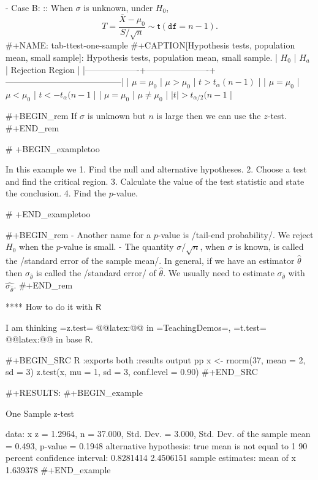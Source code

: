 - Case B: :: When \(\sigma\) is unknown, under \(H_{0}\),
   \[
   T = \frac{\overline{X} - \mu_{0}}{S/\sqrt{n}} \sim \mathsf{t}(\mathtt{df} = n - 1).
   \]
   #+NAME: tab-ttest-one-sample
   #+CAPTION[Hypothesis tests, population mean, small sample]: Hypothesis tests, population mean, small sample.
   | \(H_{0}\)         | \(H_{a}\)            | Rejection Region                        |
   |-------------------+----------------------+-----------------------------------------|
   | \(\mu = \mu_{0}\) | \(\mu > \mu_{0}\)    | \(t > t_{\alpha}(n - 1)\)               |
   | \(\mu = \mu_{0}\) | \(\mu < \mu_{0}\)    | \(t < -t_{\alpha}(n - 1\)               |
   | \(\mu = \mu_{0}\) | \(\mu \neq \mu_{0}\) | \( \vert t \vert > t_{\alpha/2}(n - 1\) |

#+BEGIN_rem
If \(\sigma\) is unknown but \(n\) is large then we can use the
\(z\)-test.
#+END_rem

# +BEGIN_exampletoo

In this example we
1. Find the null and alternative hypotheses.
2. Choose a test and find the critical region.
3. Calculate the value of the test statistic and state the conclusion.
4. Find the \(p\)-value.

# +END_exampletoo


#+BEGIN_rem
- Another name for a \(p\)-value is /tail-end probability/. We reject
  \(H_{0}\) when the \(p\)-value is small.
- The quantity \(\sigma/\sqrt{n}\), when \(\sigma\) is known, is
  called the /standard error of the sample mean/. In general, if we
  have an estimator \(\hat{\theta}\) then \(\sigma_{\hat{\theta}}\) is
  called the /standard error/ of \(\hat{\theta}\). We usually need to
  estimate \(\sigma_{\hat{\theta}}\) with
  \(\hat{\sigma_{\hat{\theta}}}\).
#+END_rem

**** How to do it with \(\mathsf{R}\)

I am thinking =z.test= @@latex:@@ in
=TeachingDemos=, =t.test= @@latex:@@ in base
\(\mathsf{R}\).

#+BEGIN_SRC R :exports both :results output pp 
x <- rnorm(37, mean = 2, sd = 3)
z.test(x, mu = 1, sd = 3, conf.level = 0.90)
#+END_SRC

#+RESULTS:
#+BEGIN_example

	One Sample z-test

data:  x
z = 1.2964, n = 37.000, Std. Dev. = 3.000, Std. Dev. of the sample mean = 0.493,
p-value = 0.1948
alternative hypothesis: true mean is not equal to 1
90 percent confidence interval:
 0.8281414 2.4506151
sample estimates:
mean of x 
 1.639378
#+END_example

